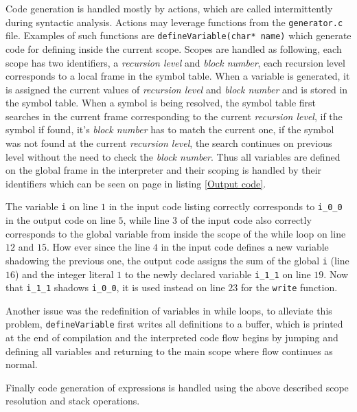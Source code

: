 \documentclass[11pt]{article}
\begin{document}
Code generation is handled mostly by actions, which are called intermittently during syntactic analysis. Actions may leverage functions from the \texttt{generator.c} file. Examples of such functions are \texttt{defineVariable(char* name)} which generate code for defining inside the current scope. Scopes are handled as following, each scope has two identifiers, a \emph{recursion level} and \emph{block number}, each recursion level corresponds to a local frame in the symbol table. When a variable is generated, it is assigned the current values of \emph{recursion level} and \emph{block number} and is stored in the symbol table. When a symbol is being resolved, the symbol table first searches in the current frame corresponding to the current \emph{recursion level}, if the symbol if found, it's \emph{block number} has to match the current one, if the symbol was not found at the current \emph{recursion level}, the search continues on previous level without the need to check the \emph{block number}. Thus all variables are defined on the global frame in the interpreter and their scoping is handled by their identifiers which can be seen on page \pageref{Code example} in listing \ref{Output code}.



\newpage
 The variable \texttt{i} on line $1$ in the input code listing correctly corresponds to \texttt{i\_0\_0} in the output code on line $5$, while line $3$ of the input code also correctly corresponds to the global variable from inside the scope of the while loop on line $12$ and $15$. How ever since the line $4$ in the input code defines a new variable shadowing the previous one, the output code assigns the sum of the global \texttt{i} (line $16$) and the integer literal $1$ to the newly declared variable \texttt{i\_1\_1} on line $19$. Now that \texttt{i\_1\_1} shadows \texttt{i\_0\_0}, it is used instead on line $23$ for the \texttt{write} function.
 
Another issue was the redefinition of variables in while loops, to alleviate this problem, \texttt{defineVariable} first writes all definitions to a buffer, which is printed at the end of compilation and the interpreted code flow begins by jumping and defining all variables and returning to the main scope where flow continues as normal.

Finally code generation of expressions is handled using the above described scope resolution and stack operations.
\end{document}
